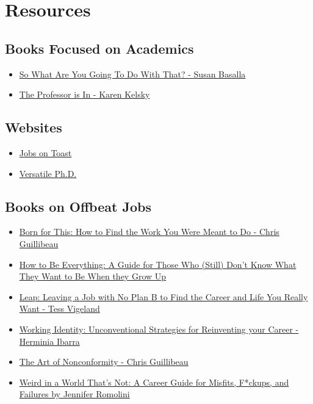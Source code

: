 \documentclass[]{book}
\providecommand{\tightlist}{%
  \setlength{\itemsep}{0pt}\setlength{\parskip}{0pt}}
\theoremstyle{definition}
\theoremstyle{definition}
\theoremstyle{definition}
\theoremstyle{remark}
\begin{document}
\section{Resources}\label{resources-1}

\subsection{Books Focused on
Academics}\label{books-focused-on-academics}

\begin{itemize}
\tightlist
\item
  \href{https://www.amazon.com/What-Are-You-Going-That/dp/0374526214}{So
  What Are You Going To Do With That? - Susan Basalla}
\item
  \href{http://theprofessorisin.com/buy-the-book/}{The Professor is In -
  Karen Kelsky}
\end{itemize}

\subsection{Websites}\label{websites}

\begin{itemize}
\tightlist
\item
  \href{http://jobsontoast.com/}{Jobs on Toast}
\item
  \href{https://versatilephd.com/}{Versatile Ph.D.}
\end{itemize}

\subsection{Books on Offbeat Jobs}\label{books-on-offbeat-jobs}

\begin{itemize}
\tightlist
\item
  \href{https://bornforthisbook.com/}{Born for This: How to Find the
  Work You Were Meant to Do - Chris Guillibeau}
\item
  \href{https://www.harpercollins.com/9780062566652/how-to-be-everything/}{How
  to Be Everything: A Guide for Those Who (Still) Don't Know What They
  Want to Be When they Grow Up}
\item
  \href{https://www.tessvigeland.com/}{Leap: Leaving a Job with No Plan
  B to Find the Career and Life You Really Want - Tess Vigeland}
\item
  \href{https://herminiaibarra.com/books/}{Working Identity:
  Unconventional Strategies for Reinventing your Career - Herminia
  Ibarra}
\item
  \href{https://chrisguillebeau.com}{The Art of Nonconformity - Chris
  Guillibeau}
\item
  \href{https://www.harpercollins.com/9780062472724/weird-in-a-world-thats-not/}{Weird
  in a World That's Not: A Career Guide for Misfits, F*ckups, and
  Failures by Jennifer Romolini}
\end{itemize}
\end{document}
